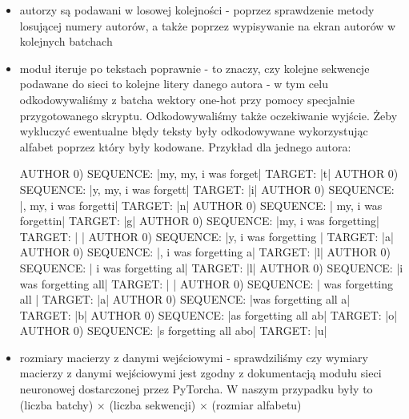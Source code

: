	\begin{itemize} 
	  \item {autorzy są podawani w losowej kolejności - poprzez sprawdzenie metody losującej numery autorów,
	  a także poprzez wypisywanie na ekran autorów w kolejnych batchach}
	  \item {moduł iteruje po tekstach poprawnie - to znaczy, czy kolejne sekwencje podawane do sieci to 
	  kolejne litery danego autora - w tym celu odkodowywaliśmy z batcha wektory one-hot przy pomocy 
	  specjalnie przygotowanego skryptu. Odkodowywaliśmy także oczekiwanie wyjście. Żeby wykluczyć ewentualne błędy
	  teksty były odkodowywane wykorzystując alfabet poprzez który były kodowane.
	  Przykład dla jednego autora:
\begin{bash}
AUTHOR 0) SEQUENCE: |my, my, i was forget|     TARGET: |t|
AUTHOR 0) SEQUENCE: |y, my, i was forgett|     TARGET: |i|
AUTHOR 0) SEQUENCE: |, my, i was forgetti|     TARGET: |n|
AUTHOR 0) SEQUENCE: | my, i was forgettin|     TARGET: |g|
AUTHOR 0) SEQUENCE: |my, i was forgetting|     TARGET: | |
AUTHOR 0) SEQUENCE: |y, i was forgetting |     TARGET: |a|
AUTHOR 0) SEQUENCE: |, i was forgetting a|     TARGET: |l|
AUTHOR 0) SEQUENCE: | i was forgetting al|     TARGET: |l|
AUTHOR 0) SEQUENCE: |i was forgetting all|     TARGET: | |
AUTHOR 0) SEQUENCE: | was forgetting all |     TARGET: |a|
AUTHOR 0) SEQUENCE: |was forgetting all a|     TARGET: |b|
AUTHOR 0) SEQUENCE: |as forgetting all ab|     TARGET: |o|
AUTHOR 0) SEQUENCE: |s forgetting all abo|     TARGET: |u|
\end{bash} }
	  \item {rozmiary macierzy z danymi wejściowymi - sprawdziliśmy czy wymiary macierzy z danymi wejściowymi jest zgodny 
	  z dokumentacją modułu sieci neuronowej dostarczonej przez PyTorcha. W naszym przypadku były to 
	  (liczba batchy) $\times$ (liczba sekwencji) $\times$ (rozmiar alfabetu) }
	\end{itemize}

